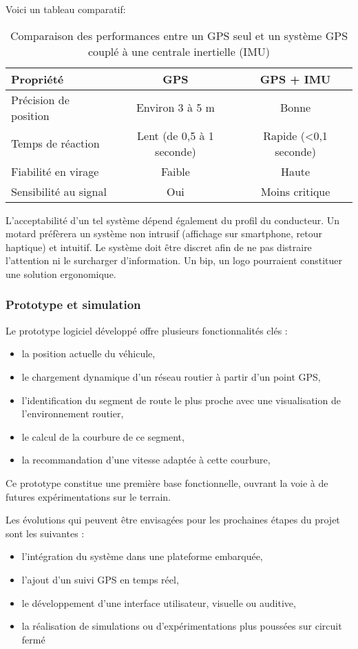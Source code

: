 \vspace{0.5cm}
Voici un tableau comparatif:
\begin{table}[h!]
\centering
\begin{tabular}{|p{4.5cm}|c|c|}
\hline
\textbf{Propriété} & \textbf{GPS} & \textbf{GPS + IMU} \\
\hline
Précision de position & Environ 3 à 5 m & Bonne \\
Temps de réaction & Lent (de 0,5 à 1 seconde) & Rapide (<0,1 seconde) \\
Fiabilité en virage & Faible & Haute \\
Sensibilité au signal & Oui & Moins critique \\
\hline
\end{tabular}
\caption{Comparaison des performances entre un GPS seul et un système GPS couplé à une centrale inertielle (IMU)}
\label{tab:gps-vs-imu}
\end{table}

L’acceptabilité d’un tel système dépend également du profil du conducteur. Un motard préfèrera un système non intrusif (affichage sur smartphone, retour haptique) et intuitif. Le système doit être discret afin de ne pas distraire l’attention ni le surcharger d’information. Un bip, un logo pourraient constituer une solution ergonomique.


\subsubsection{Prototype et simulation}
Le prototype logiciel développé offre plusieurs fonctionnalités clés :
\begin{itemize}
  \item la position actuelle du véhicule,
  \item le chargement dynamique d’un réseau routier à partir d’un point GPS,
  \item l’identification du segment de route le plus proche avec une visualisation de l’environnement routier,
  \item le calcul de la courbure de ce segment,
  \item la recommandation d’une vitesse adaptée à cette courbure,
\end{itemize}
Ce prototype constitue une première base fonctionnelle, ouvrant la voie à de futures expérimentations sur le terrain.

Les évolutions qui peuvent être envisagées pour les prochaines étapes du projet sont les suivantes :
\begin{itemize}
  \item l’intégration du système dans une plateforme embarquée,
  \item l’ajout d’un suivi GPS en temps réel,
  \item le développement d’une interface utilisateur, visuelle ou auditive,
  \item la réalisation de simulations ou d’expérimentations plus poussées sur circuit fermé
\end{itemize}

